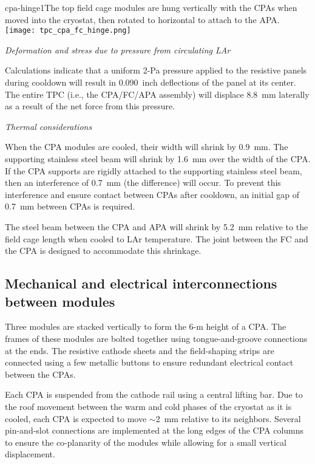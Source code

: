 \begin{cdrfigure}{cpa-hinge1}{The top field cage modules are hung vertically with the CPAs when moved into the cryostat, then rotated to horizontal to attach to the APA.} 
\texttt{[image: tpc\_cpa\_fc\_hinge.png]}
\end{cdrfigure}


\textit{Deformation and stress due to pressure from circulating LAr}

Calculations indicate that a uniform 2-Pa pressure 
  applied to the resistive panels  during cooldown will result in 0.090~inch deflections of the panel at its center.  The entire TPC (i.e., the CPA/FC/APA assembly) will displace 8.8~mm laterally as a result of the net force from this pressure.  

\textit{Thermal considerations}

When the CPA modules are cooled, their width will shrink by 0.9~mm.  The supporting stainless steel beam will shrink by 1.6~mm over the width of the CPA.  If the CPA supports are rigidly attached to the supporting stainless steel beam, then an interference of 0.7~mm (the difference) will occur.  To prevent this interference and ensure contact between CPAs after cooldown, an initial gap of 0.7~mm between CPAs is required.  

The steel beam between the CPA and APA will shrink by 5.2~mm relative to the field cage length when cooled to LAr temperature.  The joint between the FC and the CPA is designed to accommodate this shrinkage.



\subsection{Mechanical and electrical interconnections between modules}

Three modules are stacked vertically to form the 6-m height of a CPA. %
The frames of these modules are bolted together using tongue-and-groove connections at the ends. The resistive cathode sheets and the field-shaping strips are connected using a few metallic buttons to ensure redundant electrical contact between the CPAs. %

Each CPA is suspended from the cathode rail using a central lifting bar.  Due to the roof movement between the warm and cold phases of the cryostat as it is cooled, each CPA is expected to move $\sim$2~mm relative to its neighbors.  Several pin-and-slot connections are implemented at the long edges of the CPA columns to ensure the co-planarity of the modules while allowing for a small vertical displacement.  

